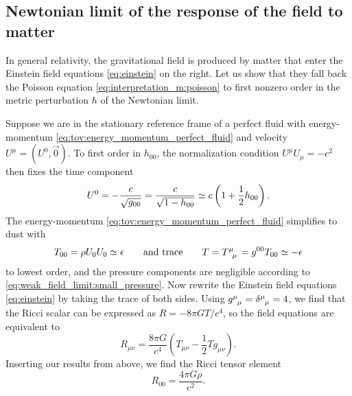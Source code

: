 \subsection{Newtonian limit of the response of the field to matter}
\label{sec:einstein_to_poisson}

In general relativity, the gravitational field is produced by matter that enter the Einstein field equations \eqref{eq:einstein} on the right.
Let us show that they fall back the Poisson equation \eqref{eq:interpretation_m:poisson} to first nonzero order in the metric perturbation $h$ of the Newtonian limit.

Suppose we are in the stationary reference frame of a perfect fluid with energy-momentum \eqref{eq:tov:energy_momentum_perfect_fluid} and velocity $U^\mu = (U^0, \vec{0})$.
To first order in $h_{00}$, the normalization condition $U^\mu U_\mu = -c^2$ then fixes the time component
\begin{equation}
	U^0 = - \frac{c}{\sqrt{g_{00}}} = \frac{c}{\sqrt{1-h_{00}}} \simeq c \left( 1 + \frac12 h_{00} \right) .
\end{equation}
The energy-momentum \eqref{eq:tov:energy_momentum_perfect_fluid} simplifies to dust with
\begin{equation}
	T_{00} = \rho U_0 U_0 \taylor \epsilon
	\qquad \text{and trace} \qquad
	T = T\indices{^\mu_\mu} = g^{00} T_{00} \taylor -\epsilon
\end{equation}
to lowest order, and the pressure components are negligible according to \cref{eq:weak_field_limit:small_pressure}.
Now rewrite the Einstein field equations \eqref{eq:einstein} by taking the trace of both sides.
Using $g\indices{^\mu_\mu} = \delta\indices{^\mu_\mu} = 4$, we find that the Ricci scalar can be expressed as $R = - 8 \pi G T / c^4$, so the field equations are equivalent to
\begin{equation}
	R_{\mu \nu} = \frac{8 \pi G}{c^4} \left( T_{\mu \nu} - \frac12 T g_{\mu \nu} \right) .
	\label{eq:einstein_rewritten}
\end{equation}
Inserting our results from above, we find the Ricci tensor element
\begin{equation}
	R_{00} = \frac{4 \pi G \rho}{c^2} .
	\label{eq:weak_field_limit:ricci_from_energy_momentum}
\end{equation}

